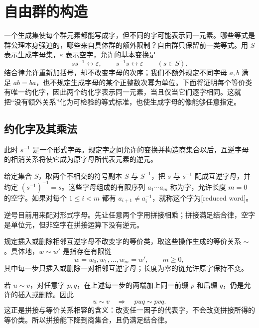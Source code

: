 
\section{自由群的构造}
\label{b1:sec:0801}

一个生成集使每个群元素都能写成字，但不同的字可能表示同一元素。哪些等式是群公理本身强迫的，哪些来自具体群的额外限制？自由群只保留前一类等式。用 \(S\) 表示生成字母集，\(\varepsilon\) 表示空字，允许的基本变换是
\[
	ss^{-1}\longleftrightarrow\varepsilon,\qquad s^{-1}s\longleftrightarrow\varepsilon\qquad(s\in S).
\]
结合律允许重新加括号，却不改变字母的次序；我们不额外规定不同字母 \(a,b\) 满足 \(ab=ba\)，也不规定生成字母的某个正整数次幂为单位。下面将证明每个等价类有唯一约化字，因此两个约化字表示同一元素，当且仅当它们逐字相同。这就把“没有额外关系”化为可检验的等式标准，也使生成字母的像能够任意指定。

%
%

\subsection{约化字及其乘法}
\label{b1:subsec:0801:01}

此时 \(s^{-1}\) 是一个形式字母。规定字之间允许的变换并构造商集合以后，互逆字母的相消关系将使它成为原字母所代表元素的逆元。

\begin{definition}\label{b1:def:reduced-word}
	给定集合 \(S\)，取两个不相交的符号副本 \(S\) 与 \(S^{-1}\)，把 \(s\) 与 \(s^{-1}\) 配成互逆字母，并约定 \((s^{-1})^{-1}=s\)。这些字母组成的有限序列 \(a_1\cdots a_m\) 称为字，允许长度 \(m=0\) 的空字。如果对每个 \(1\le i<m\) 都有 \(a_{i+1}\ne a_i^{-1}\)，就称这个字为[reduced word]。
\end{definition}

逆号目前用来配对形式字母。先让任意两个字用拼接相乘；拼接满足结合律，空字是单位元，但非空字在拼接运算下没有逆元。

\ProseParagraphBreak
规定插入或删除相邻互逆字母不改变字的等价类，取这些操作生成的等价关系 \(\sim\)。具体地，\(w\sim w'\) 是指存在有限链
\[
	w=w_0,w_1,\ldots,w_m=w',\qquad m\ge0,
\]
其中每一步只插入或删除一对相邻互逆字母；长度为零的链允许原字保持不变。

\ProseParagraphBreak
若 \(u\sim v\)，对任意字 \(p,q\)，在上述每一步的两端加上同一前缀 \(p\) 和后缀 \(q\)，仍是允许的插入或删除。因此
\[
	u\sim v\quad\Longrightarrow\quad puq\sim pvq.
\]
这正是拼接与等价关系相容的含义：改变任一因子的代表字，不会改变拼接所得的等价类。所以拼接能下降到商集合，且仍满足结合律。

